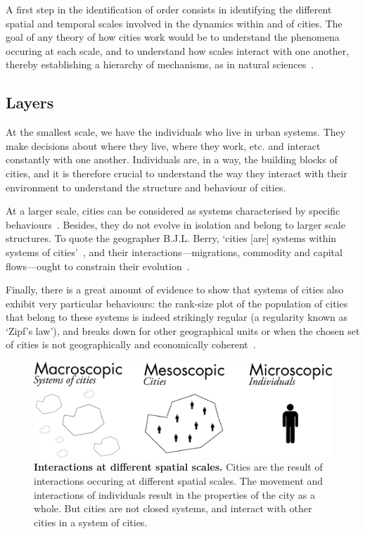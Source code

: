 A first step in the identification of order consists in identifying the different
spatial and temporal scales involved in the dynamics within and of cities. The
goal of any theory of how cities work would be to understand the phenomena
occuring at each scale, and to understand how scales interact with one another,
thereby establishing a hierarchy of
mechanisms, as in natural sciences~\cite{Simon:1962}.



\subsection{Layers}
\label{ssub:layers}

At the smallest scale, we have the individuals who live in urban
systems. They make decisions about where they live, where they work, etc. and
interact constantly with one another. Individuals are, in a way, the building
blocks of cities, and it is therefore crucial to understand the way they
interact with their environment to understand the structure and behaviour of
cities.

At a larger scale, cities can be considered as systems characterised by specific
behaviours~\cite{Bettencourt:2007}. Besides, they do not evolve in isolation and
belong to larger scale structures. To quote the geographer B.J.L. Berry, `cities
[are] systems within systems of cities'~\cite{Berry:1964}, and their
interactions---migrations, commodity and capital flows---ought to constrain
their evolution~\cite{Pumain:2010}. 

Finally, there is a great amount of evidence to show that systems of cities also
exhibit very particular behaviours: the rank-size plot of the population of
cities that belong to these systems is indeed strikingly regular (a regularity
known as `Zipf's law'), and breaks down for other geographical units or when the
chosen set of cities is not geographically and economically
coherent~\cite{Cristelli:2012}.\\


\begin{figure}[!h]
    \centering
    \includegraphics[width=\textwidth]{./gfx/chapter-intro/spatial_scales.pdf}
    \caption{{\bf Interactions at different spatial scales.} Cities are the
    result of interactions occuring at different spatial scales. The movement
and interactions of individuals result in the properties of the city as a whole.
But cities are not closed systems, and interact with other cities in a system of
cities.\label{fig:spatialscale}}
\end{figure}


